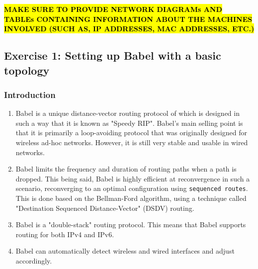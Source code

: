 \documentclass[main.tex]{subfiles}
\begin{document}
\hfill \break
\hl{\textbf{MAKE SURE TO PROVIDE NETWORK DIAGRAMs AND TABLEs CONTAINING INFORMATION ABOUT THE MACHINES INVOLVED (SUCH AS, IP ADDRESSES, MAC ADDRESSES, ETC.)}}

\subsection{Exercise 1: Setting up Babel with a basic topology}

\subsubsection{Introduction}
\begin{enumerate}[noitemsep,label=$\bullet$,leftmargin=20mm,labelsep=0.5cm]

\item Babel is a unique distance-vector routing protocol of which is designed in such a way that it is known as "Speedy RIP". Babel's main selling point is that it is primarily a loop-avoiding protocol that was originally designed for wireless ad-hoc networks. However, it is still very stable and usable in wired networks. 

\item Babel limits the frequency and duration of routing paths when a path is dropped. This being said, Babel is highly efficient at reconvergence in such a scenario, reconverging to an optimal configuration using \texttt{sequenced routes}. This is done based on the Bellman-Ford algorithm, using a technique called "Destination Sequenced Distance-Vector" (DSDV) routing. 

\item Babel is a "double-stack" routing protocol. This means that Babel supports routing for both IPv4 and IPv6.

\item Babel can automatically detect wireless and wired interfaces and adjust accordingly.

\end{enumerate}
\end{document}

